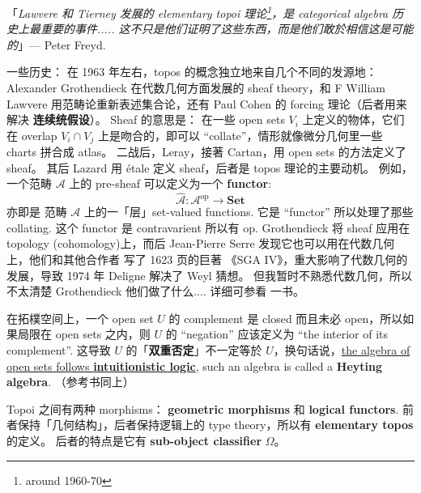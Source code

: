 \documentclass[12pt, orivec]{article}
\begin{document}
「\textit{Lawvere 和 Tierney 发展的 elementary topoi 理论\footnote{around 1960-70}，是 categorical algebra 历史上最重要的事件.....  这不只是他们证明了这些东西，而是他们敢於相信这是可能的}」--- Peter Freyd.

一些历史： 在 1963 年左右，topos 的概念独立地来自几个不同的发源地： Alexander Grothendieck 在代数几何方面发展的 sheaf theory，和 F William Lawvere 用范畴论重新表述集合论，还有 Paul Cohen 的 forcing 理论（后者用来解决 \textbf{连续统假设}）。  Sheaf 的意思是： 在一些 open sets $V_i$ 上定义的物体，它们在 overlap $V_i \cap V_j$ 上是吻合的，即可以 ``collate''，情形就像微分几何里一些 charts 拼合成 atlas。  二战后，Leray，接著 Cartan，用 open sets 的方法定义了 sheaf。 其后 Lazard 用 \'{e}tale 定义 sheaf，后者是 topos 理论的主要动机。  例如，一个范畴 $\mathcal{A}$ 上的 pre-sheaf 可以定义为一个 \textbf{functor}:
\begin{equation}
\widehat{\mathcal{A}}: \mathcal{A}^{\mathrm{op}} \rightarrow \mathbf{Set}
\end{equation}
亦即是 范畴 $\mathcal{A}$ 上的一「层」set-valued functions.  它是 ``functor'' 所以处理了那些 collating.  这个 functor 是 contravarient 所以有 $\mathrm{op}$.  Grothendieck 将 sheaf 应用在 topology (cohomology)上，而后 Jean-Pierre Serre 发现它也可以用在代数几何上，他们和其他合作者 写了 1623 页的巨著 《SGA IV》，重大影响了代数几何的发展，导致 1974 年 Deligne 解决了 Weyl 猜想。  但我暂时不熟悉代数几何，所以不太清楚 Grothendieck 他们做了什么.... 详细可参看 \parencite{MacLane1992} 一书。

在拓樸空间上，一个 open set $U$ 的 complement 是 closed 而且未必 open，所以如果局限在 open sets 之内，则 $U$ 的 ``negation'' 应该定义为 ``the interior of its complement''.  这导致 $U$ 的「\textbf{双重否定}」不一定等於 $U$，换句话说，\uline{the algebra of open sets follows \textbf{intuitionistic logic}}, such an algebra is called a \textbf{Heyting algebra}.  （参考书同上）

Topoi 之间有两种 morphisms： \textbf{geometric morphisms} 和 \textbf{logical functors}.  前者保持「几何结构」，后者保持逻辑上的 type theory，所以有 \textbf{elementary topos} 的定义。 后者的特点是它有 \textbf{sub-object classifier} $\Omega$。 
\end{document}
